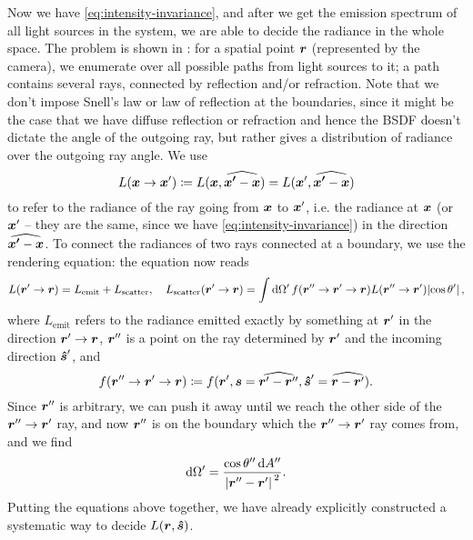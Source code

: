 \documentclass[hyperref, a4paper]{article}
\begin{document}
Now we have \eqref{eq:intensity-invariance}, 
and after we get the emission spectrum of all light sources in the system, 
we are able to decide the radiance in the whole space. 
The problem is shown in : 
for a spatial point $\vb*{r}$ (represented by the camera), 
we enumerate over all possible paths from light sources to it;
a path contains several rays, 
connected by reflection and/or refraction.
Note that we don't impose Snell's law or law of reflection 
at the boundaries, 
since it might be the case that we have diffuse reflection or refraction 
and hence the BSDF doesn't 
dictate the angle of the outgoing ray, 
but rather gives a distribution of radiance 
over the outgoing ray angle.
We use 
\begin{equation}
    L(\vb*{x} \to \vb*{x}') \coloneqq L(\vb*{x}, \widehat{\vb*{x'} - \vb*{x}})
    = L(\vb*{x}', \widehat{\vb*{x'} - \vb*{x}})
\end{equation}
to refer to the radiance of the ray going from $\vb*{x}$ to $\vb*{x}'$, 
i.e. the radiance at $\vb*{x}$ (or $\vb*{x}'$ -- they are the same, since we have \eqref{eq:intensity-invariance})
in the direction $\widehat{\vb*{x'} - \vb*{x}}$.
To connect the radiances of two rays connected at a boundary, 
we use the rendering equation: 
the equation now reads 
\begin{equation}
    L(\vb*{r}' \to \vb*{r}) = L_{\text{emit}} + L_{\text{scatter}} , \quad L_{\text{scatter}}(\vb*{r}' \to \vb*{r})
    = \int \dd{\Omega'} f(\vb*{r}'' \to \vb*{r}' \to \vb*{r} ) 
    L(\vb*{r}'' \to \vb*{r}') \abs*{\cos \theta'} ,
\end{equation}
where $L_{\text{emit}}$ refers to the radiance emitted exactly by something at $\vb*{r}'$
in the direction $\vb*{r}' \to \vb*{r}$, 
$\vb*{r}''$ is a point on the ray 
determined by $\vb*{r}'$ and the incoming direction $\vu*{s}'$, 
and 
\begin{equation}
    f(\vb*{r}'' \to \vb*{r}' \to \vb*{r} ) 
    \coloneqq f(\vb*{r}', \vb*{s} = \widehat{\vb*{r}' - \vb*{r}''}, \vu*{s}' = \widehat{\vb*{r} - \vb*{r}'}).
\end{equation}
Since $\vb*{r}''$ is arbitrary, 
we can push it away until we reach the other side of the 
$\vb*{r}'' \to \vb*{r}'$ ray, 
and now $\vb*{r}''$ is on the boundary 
which the $\vb*{r}'' \to \vb*{r}'$ ray comes from,
and we find 
\begin{equation}
    \dd{\Omega'} = \frac{\cos \theta'' \dd{A''}}{\abs*{\vb*{r}'' - \vb*{r}'}^2}.
\end{equation}
Putting the equations above together, 
we have already explicitly constructed 
a systematic way to decide $L(\vb*{r}, \vu*{s})$.
\end{document}
